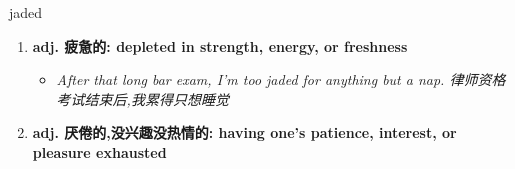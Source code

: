 
\begin{frame}
{\huge jaded}
\begin{center}
\begin{enumerate}\Large
  \item \textbf{adj. 疲惫的: depleted in strength, energy, or freshness}
  \begin{itemize}
    \item \em{\Large{After that long bar exam, I'm too jaded for anything but a nap. 律师资格考试结束后,我累得只想睡觉}}
  \end{itemize}
  \item \textbf{adj. 厌倦的,没兴趣没热情的: having one's patience, interest, or pleasure exhausted}
\end{enumerate}
\end{center}
\end{frame}
